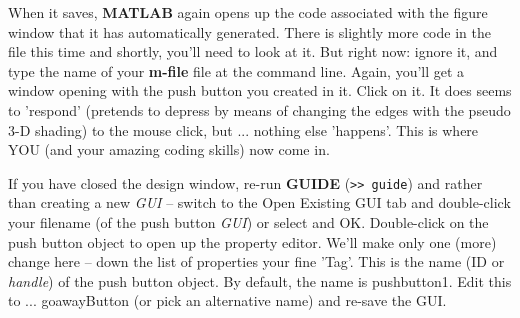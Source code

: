 \documentclass{tufte-book} %
\begin{document}
When it saves, \textbf{MATLAB} again opens up the code associated with the figure window that it has automatically generated. There is slightly more code in the file this time and shortly, you'll need to look at it. But right now: ignore it,  and type the name of your \textbf{m-file} file at the command line. Again, you'll get a window opening with the push button you created in it. Click on it. It does seems to 'respond' (pretends to depress by means of changing the edges with the pseudo 3-D shading) to the mouse click, but ... nothing else 'happens'. This is where YOU (and your amazing coding skills) now come in.

If you have closed the design window, re-run \textbf{GUIDE} (\texttt{\textgreater\textgreater\ guide}) and rather than creating a new \textit{GUI} -- switch to the \textsf{Open Existing GUI} tab and double-click your filename (of the push button \textit{GUI}) or select and OK. Double-click on the push button object to open up the property editor. We'll make only one (more) change here -- down the list of properties your fine '\textsf{Tag}'. This is the name (ID or \textit{handle}) of the push button object. By default, the name is \textsf{pushbutton1}. Edit this to ... \textsf{goawayButton} (or pick an alternative name) and re-save the GUI.
\end{document}
